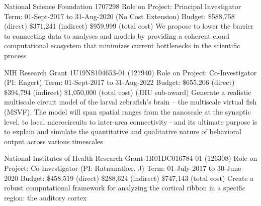 \documentclass[10pt,colorlinks=true,urlcolor=blue]{moderncv}
\begin{document}
{\newline National Science Foundation 1707298
\newline Role on Project: Principal Investigator
\newline Term: 01-Sept-2017 to 31-Aug-2020 (No Cost Extension)
\newline Budget: \$588,758 (direct) \$371,241 (indirect) \$959,999 (total cost)
\newline We propose to lower the barrier to connecting data to analyses and models by providing a
coherent cloud computational ecosystem that minimizes current bottlenecks in the scientific
process}{}{}{}{}

{\newline NIH Research Grant 1U19NS104653-01 (127940)
\newline Role on Project: Co-Investigator (PI: Engert)
\newline Term: 01-Sept-2017 to 31-Aug-2022
\newline Budget: \$655,206 (direct) \$394,794 (indirect) \$1,050,000 (total cost) (JHU sub-award)
\newline Generate a realistic multiscale circuit model of the larval zebrafish’s brain – the multiscale
virtual fish (MSVF). The model will span spatial ranges from the nanoscale at the synaptic
level, to local microcircuits to inter-area connectivity - and its ultimate purpose is to explain
and simulate the quantitative and qualitative nature of behavioral output across various
timescales}{}{}{}{}

{\newline National Institutes of Health Research Grant 1R01DC016784-01 (126308)
\newline Role on Project: Co-Investigator (PI: Ratnanather, J)
\newline Term: 01-July-2017 to 30-June-2020
\newline Budget: \$458,519 (direct) \$288,624 (indirect) \$747,143 (total cost)
\newline Create a robust computational framework for analyzing the cortical ribbon in a specific
region: the auditory cortex}{}{}{}{}
\end{document}
